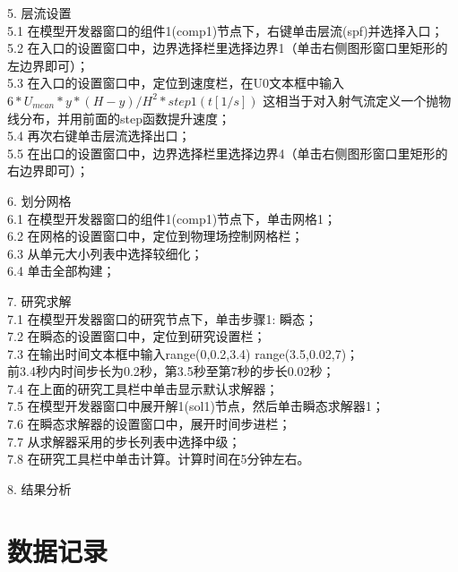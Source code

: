 \documentclass[a4paper,zihao=5,UTF8,fontset=fandol]{phyreport}
\begin{document}
5. 层流设置\\
5.1 在模型开发器窗口的组件1(comp1)节点下，右键单击层流(spf)并选择入口；\\
5.2 在入口的设置窗口中，边界选择栏里选择边界1（单击右侧图形窗口里矩形的左边界即可）；\\
5.3 在入口的设置窗口中，定位到速度栏，在U0文本框中输入\texttt{$6*U_{mean}*y*(H-y)/H^2*step1(t[1/s])$}
这相当于对入射气流定义一个抛物线分布，并用前面的step函数提升速度；\\
5.4 再次右键单击层流选择出口；\\
5.5 在出口的设置窗口中，边界选择栏里选择边界4（单击右侧图形窗口里矩形的右边界即可）；

6. 划分网格\\
6.1 在模型开发器窗口的组件1(comp1)节点下，单击网格1；\\
6.2 在网格的设置窗口中，定位到物理场控制网格栏；\\
6.3 从单元大小列表中选择较细化；\\
6.4 单击全部构建；

7. 研究求解\\
7.1 在模型开发器窗口的研究节点下，单击步骤1: 瞬态；\\
7.2 在瞬态的设置窗口中，定位到研究设置栏；\\
7.3 在输出时间文本框中输入range(0,0.2,3.4) range(3.5,0.02,7)；\\
前3.4秒内时间步长为0.2秒，第3.5秒至第7秒的步长0.02秒；\\
7.4 在上面的研究工具栏中单击显示默认求解器；\\
7.5 在模型开发器窗口中展开解1(sol1)节点，然后单击瞬态求解器1；\\
7.6 在瞬态求解器的设置窗口中，展开时间步进栏；\\
7.7 从求解器采用的步长列表中选择中级；\\
7.8 在研究工具栏中单击计算。计算时间在5分钟左右。

8. 结果分析\\
\newpage
\section{数据记录}
\end{document}
